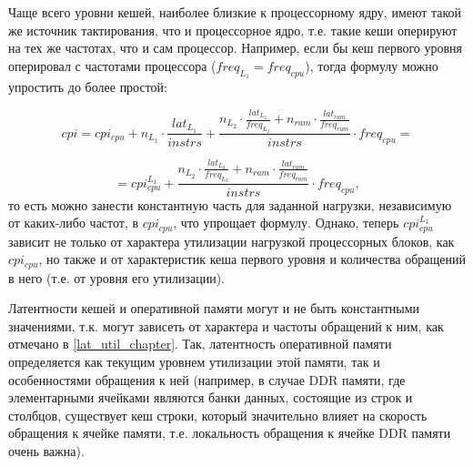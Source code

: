     Чаще всего уровни кешей, наиболее близкие к процессорному ядру, имеют такой же источник
    тактирования, что и процессорное ядро, т.е. такие кеши оперируют на тех же частотах, что и
    сам процессор. Например, если бы кеш первого уровня оперировал с частотами процессора
    ($freq_{L_1} = freq_{cpu}$), тогда формулу можно упростить до более простой:

    \begin{equation}
        cpi = cpi_{cpu} + n_{L_1} \cdot \frac{lat_{L_1}}{instrs} +
        \frac{n_{L_2} \cdot \frac{lat_{L_2}}{freq_{L_2}} +
        n_{ram} \cdot \frac{lat_{ram}}{freq_{ram}}}{instrs} \cdot freq_{cpu} =
    \end{equation}

    \begin{equation}
        = cpi_{cpu}^{L_1} + \frac{n_{L_2} \cdot \frac{lat_{L_2}}{freq_{L_2}} +
        n_{ram} \cdot \frac{lat_{ram}}{freq_{ram}}}{instrs} \cdot freq_{cpu},
    \end{equation}
    то есть можно занести константную часть для заданной нагрузки, независимую от каких-либо
    частот, в $cpi_{cpu}$, что упрощает формулу. Однако, теперь $cpi_{cpu}^{L_1}$ зависит
    не только от характера утилизации нагрузкой процессорных блоков, как $cpi_{cpu}$, но
    также и от характеристик кеша первого уровня и количества обращений в него
    (т.е. от уровня его утилизации).

    Латентности кешей и оперативной памяти могут и не быть константными значениями, т.к.
    могут зависеть от характера и частоты обращений к ним, как отмечано в \ref{lat_util_chapter}.
    Так, латентность оперативной памяти определяется как текущим уровнем утилизации этой памяти,
    так и особенностями обращения к ней (например, в случае DDR памяти,
    где элементарными ячейками являются банки данных, состоящие из строк и столбцов,
    существует кеш строки, который значительно влияет на скорость обращения
    к ячейке памяти, т.е. локальность обращения к ячейке DDR памяти очень важна).


